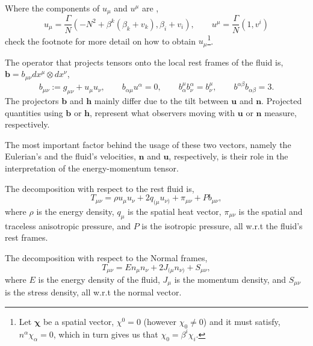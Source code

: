 Where the components of $u_\mu$ and $u^\mu$ are \cite{Buchert_2020},
\begin{equation}
    u_\mu = \frac{\Gamma}{N}(-N^2+\beta^k(\beta_k+v_k),\beta_i+v_i), \qquad u^\mu = \frac{\Gamma}{N}(1,v^i)
    \label{eqn:upper_lower_fluid}
\end{equation}
check the footnote for more detail on how to obtain $u_\mu$\footnote{Let $\bm{\chi}$ be a spatial vector, $\chi^0=0$ (however $\chi_0\neq 0$) and it must satisfy, $n^\alpha \chi_\alpha=0$, which in turn gives us that $\chi_0=\beta^i\chi_i$.}.

The operator that projects tensors onto the local rest frames of the fluid is, $\mathbf{b}=b_{\mu\nu}dx^\mu \otimes dx^\nu$,
\begin{equation}
    b_{\mu\nu}:=g_{\mu\nu}+u_\mu u_\nu,\qquad b_{\alpha\mu}u^\alpha=0,\qquad b^\mu_\alpha b^\alpha_\nu = b^\mu_\nu,\qquad b^{\alpha\beta}b_{\alpha\beta}=3.
\end{equation}
The projectors $\mathbf{b}$ and $\mathbf{h}$ mainly differ due to the tilt between $\mathbf{u}$ and $\mathbf{n}$.
Projected quantities using $\mathbf{b}$ or $\mathbf{h}$, represent what observers moving with $\mathbf{u}$ or $\mathbf{n}$ measure, respectively.


The most important factor behind the usage of these two vectors, namely the Eulerian's and the fluid's velocities, $\mathbf{n}$ and $\mathbf{u}$, respectively, is their role in the interpretation of the energy-momentum tensor.

The decomposition with respect to the rest fluid is,
\begin{equation}
    T_{\mu\nu}=\rho u_\mu u_\nu + 2q_{(\mu}u_{\nu)} + \pi_{\mu\nu} + P b_{\mu\nu},
    \label{eqn:general_decomposition_energy_tensor_fluid}
\end{equation}
where $\rho$ is the energy density, $q_\mu$ is the spatial heat vector, $\pi_{\mu\nu}$ is the spatial and traceless anisotropic pressure, and $P$ is the isotropic pressure, all w.r.t the fluid's rest frames.

The decomposition with respect to the Normal frames,
\begin{equation}
    T_{\mu\nu} = E n_\mu n_\nu + 2J_{(\mu}n_{\nu)}+ S_{\mu\nu},
    \label{eqn:general_decomposition_energy_tensor_normal}
\end{equation}
where $E$ is the energy density of the fluid, $J_\mu$ is the momentum density, and $S_{\mu\nu}$ is the stress density, all w.r.t the normal vector.

